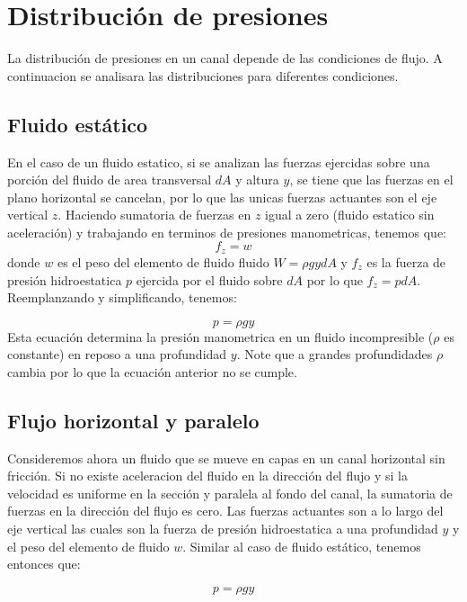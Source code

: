 \documentclass[11pt, oneside]{article}
\begin{document}
\section{Distribuci\'on de presiones}%
La distribuci\'on de presiones en un canal depende de las condiciones de flujo. A continuacion se analisara las distribuciones para diferentes condiciones.

\subsection{Fluido est\'atico}
En el caso de un fluido estatico, si se analizan las fuerzas ejercidas sobre una porci\'on del fluido de area transversal $dA$ y altura $y$, se tiene que las fuerzas en el plano horizontal se cancelan, por lo que las unicas fuerzas actuantes son el eje vertical $z$. Haciendo sumatoria de fuerzas en $z$ igual a zero (fluido estatico sin aceleraci\'on) y trabajando en terminos de presiones manometricas, tenemos que:
$$
f_z = w
$$
donde $w$ es el peso del elemento de fluido fluido $W=\rho g y dA$ y $f_z$ es la fuerza de presi\'on hidroestatica $p$ ejercida  por el fluido sobre $dA$ por lo que $f_z = p dA$. Reemplanzando y simplificando, tenemos:

$$
p=\rho g y
$$
Esta ecuaci\'on determina la presi\'on manometrica en un fluido incompresible ($\rho$ es constante) en reposo a una profundidad $y$. Note que a grandes profundidades $\rho$ cambia por lo que la ecuaci\'on anterior no se cumple.

\subsection{Flujo horizontal y paralelo}
Consideremos ahora un fluido que se mueve en capas en un canal horizontal sin fricci\'on. Si  no existe aceleracion del fluido en la direcci\'on del flujo y si la velocidad es uniforme en la secci\'on y paralela al fondo del canal, la sumatoria de fuerzas en la direcci\'on del flujo es cero. Las fuerzas actuantes son a lo largo del eje vertical las cuales son la fuerza de presi\'on hidroestatica a una profundidad $y$ y el peso del elemento de fluido $w$. Similar al caso de fluido est\'atico, tenemos entonces que:

$$
p=\rho g y
$$
 
\end{document}

